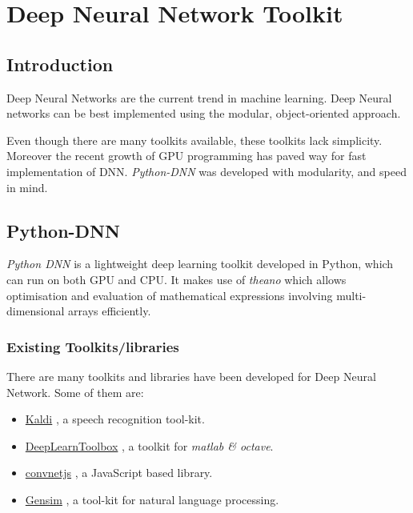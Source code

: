 \chapter{Deep Neural Network Toolkit} 
\label{chap:toolkit}
\section{Introduction}
Deep Neural Networks are the current trend in machine learning.  Deep Neural networks can be best implemented using the modular, object-oriented approach. 

Even though there are many toolkits available, these toolkits lack simplicity.  Moreover the recent growth of GPU programming has paved way for fast implementation of DNN. \textit{Python-DNN} was developed with modularity, and speed in mind.

\section{Python-DNN}
\textit{Python DNN} is a lightweight deep learning toolkit developed in Python, which can run on both GPU and CPU.  It makes use of \emph{theano}  \cite{bergstra2010theano} which allows optimisation and evaluation of mathematical expressions involving multi-dimensional arrays efficiently.

\subsection{Existing Toolkits/libraries}
There are many toolkits and libraries have been developed for Deep Neural Network.  Some of them are: 
\begin{itemize}
\item \href{http://kaldi.sourceforge.net/}{Kaldi} \citep{Povey_ASRU2011}, a speech recognition tool-kit.
\item \href{https://github.com/rasmusbergpalm/DeepLearnToolbox}{DeepLearnToolbox} \citep{IMM2012-06284}, a toolkit for \textit{matlab \& octave}.
\item \href{http://cs.stanford.edu/people/karpathy/convnetjs/}{convnetjs} \citep{convnetjs} , a JavaScript based library.
\item \href{https://radimrehurek.com/gensim}{Gensim} \citep{rehurek_lrec}, a tool-kit for natural language processing.
\end{itemize}

